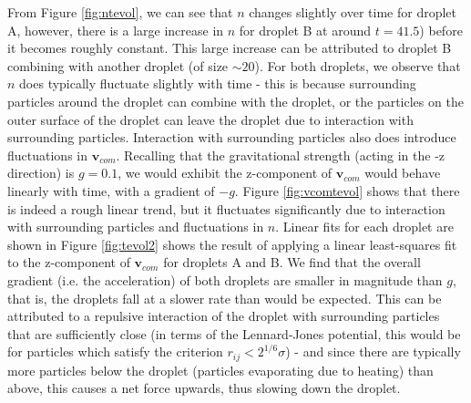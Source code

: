 \documentclass[a4paper,10pt]{article}
\begin{document}
From Figure \ref{fig:ntevol}, we can see that $n$ changes slightly over time for droplet A, however, there is a large increase in $n$ for droplet B at around $t=41.5$) before it becomes roughly constant. This large increase can be attributed to droplet B combining with another droplet (of size $\sim 20$). For both droplets, we observe that $n$ does typically fluctuate slightly with time - this is because surrounding particles around the droplet can combine with the droplet, or the particles on the outer surface of the droplet can leave the droplet due to interaction with surrounding particles. Interaction with surrounding particles also does introduce fluctuations in $\mathbf{v}_{com}$. Recalling that the gravitational strength (acting in the -z direction) is $g=0.1$, we would exhibit the z-component of $\mathbf{v}_{com}$ would behave linearly with time, with a gradient of $-g$. Figure \ref{fig:vcomtevol} shows that there is indeed a rough linear trend, but it fluctuates significantly due to interaction with surrounding particles and fluctuations in $n$. Linear fits for each droplet are shown in Figure \ref{fig:tevol2} shows the result of applying a linear least-squares fit to the z-component of $\mathbf{v}_{com}$ for droplets A and B. We find that the overall gradient (i.e. the acceleration) of both droplets are smaller in magnitude than $g$, that is, the droplets fall at a slower rate than would be expected. This can be attributed to a repulsive interaction of the droplet with surrounding particles that are sufficiently close (in terms of the Lennard-Jones potential, this would be for particles which satisfy the criterion $r_{ij} < 2^{1/6}\sigma$) - and since there are typically more particles below the droplet (particles evaporating due to heating) than above, this causes a net force upwards, thus slowing down the droplet.
\end{document}
